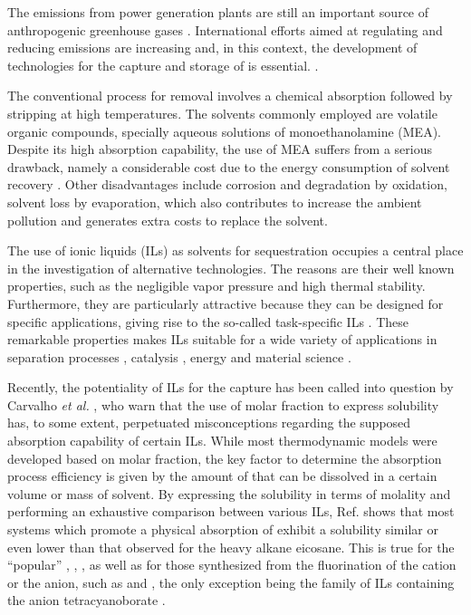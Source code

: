 \documentclass[3p,twocolumn]{elsarticle}
\begin{document}
The  emissions from power generation plants are still an important source of anthropogenic greenhouse gases \cite{totalenergy}. International efforts aimed at regulating and reducing  emissions are increasing \cite{Tong_2018} and, in this context, the development of technologies for the capture and storage of  is essential. \cite{Markewitz_2014}.

The conventional process for  removal involves a chemical absorption followed by stripping at high temperatures. The solvents commonly employed are volatile organic compounds, specially aqueous solutions of monoethanolamine (MEA). Despite its high absorption capability, the use of MEA suffers from a serious drawback, namely a considerable cost due to the energy consumption of solvent recovery \cite{Merkel_2010}. Other disadvantages include corrosion and degradation by oxidation, solvent loss by evaporation, which also contributes to increase the ambient pollution and generates extra costs to replace the solvent.

The use of ionic liquids (ILs) as solvents for  sequestration occupies a central place in the investigation of alternative technologies. The reasons are their well known properties, such as the negligible vapor pressure and high thermal stability. Furthermore, they are particularly attractive because they can be designed for specific applications, giving rise to the so-called task-specific ILs \cite{Seo_2014}. These remarkable properties makes ILs suitable for a wide variety of applications in separation processes \cite{Han_2010,Werner_2010}, catalysis \cite{P_rvulescu_2007}, energy \cite{MacFarlane_2014} and material science \cite{Mecerreyes_2011,Tom_2015,Dupont_2010,Leones_2017,Kinik_2017}.

Recently, the potentiality of ILs for the  capture has been called into question by Carvalho \textit{et al.} \cite{Carvalho_2016}, who warn that the use of molar fraction to express solubility has, to some extent, perpetuated misconceptions regarding the supposed absorption capability of certain ILs. While most thermodynamic models were developed based on molar fraction, the key factor to determine the absorption process efficiency is given by the amount of  that can be dissolved in a certain volume or mass of solvent. By expressing the solubility in terms of molality and performing an exhaustive comparison between various ILs, Ref. \cite{Carvalho_2016} shows that most systems which promote a physical absorption of  exhibit a  solubility similar or even lower than that observed for the heavy alkane eicosane. This is true for the ``popular'' \ce{[bmim][NTf_2]}, \ce{[bmim][PF_6]}, \ce{[bmim][BF_4]}, as well as for those synthesized from the fluorination of the cation or the anion, such as \ce{[(C_2H_2F_2)mim][NTf_2]} and \ce{[hmim][pFAP]}, the only exception being the family of ILs containing the anion tetracyanoborate \ce{[B(CN)_4]^-]}.
\end{document}
